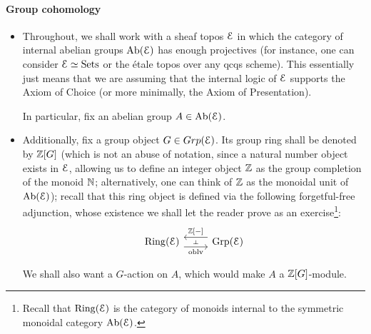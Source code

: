                 \paragraph{Group cohomology}
                    \begin{convention}
                        \noindent
                        \begin{itemize}
                            \item Throughout, we shall work with a sheaf topos $\mathcal{E}$ in which the category of internal abelian groups $\mathrm{Ab}(\mathcal{E})$ has enough projectives (for instance, one can consider $\mathcal{E} \simeq \mathrm{Sets}$ or the \'etale topos over any qcqs scheme). This essentially just means that we are assuming that the internal logic of $\mathcal{E}$ supports the Axiom of Choice (or more minimally, the Axiom of Presentation). 
                            
                            In particular, fix an abelian group $A \in \mathrm{Ab}(\mathcal{E})$.
                            \item Additionally, fix a group object $G \in Grp(\mathcal{E})$. Its group ring shall be denoted by $\mathbb{Z}[G]$ (which is not an abuse of notation, since a natural number object exists in $\mathcal{E}$, allowing us to define an integer object $\mathbb{Z}$ as the group completion of the monoid $\mathbb{N}$; alternatively, one can think of $\mathbb{Z}$ as the monoidal unit of $\mathrm{Ab}(\mathcal{E})$); recall that this ring object is defined via the following forgetful-free adjunction, whose existence we shall let the reader prove as an exercise\footnote{Recall that $\mathrm{Ring}(\mathcal{E})$ is the category of monoids internal to the symmetric monoidal category $\mathrm{Ab}(\mathcal{E})$.}:
                                $$
                                    \begin{tikzcd}
                                    	{\Ring(\E)} & {\Grp(\E)}
                                    	\arrow[""{name=0, anchor=center, inner sep=0}, "\oblv"', shift right=2, from=1-1, to=1-2]
                                    	\arrow[""{name=1, anchor=center, inner sep=0}, "{\Z[-]}"', shift right=2, from=1-2, to=1-1]
                                    	\arrow["\dashv"{anchor=center, rotate=-90}, draw=none, from=1, to=0]
                                    \end{tikzcd}
                                $$
                                
                            We shall also want a $G$-action on $A$, which would make $A$ a $\mathbb{Z}[G]$-module.
                        \end{itemize}
                    \end{convention}
                    

